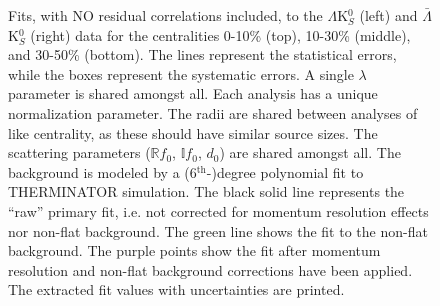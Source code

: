 \documentclass[/home/jesse/Analysis/FemtoAnalysis/AnalysisNotes/AnalysisNoteJBuxton.tex]{subfiles}
\renewcommand{\NonFlatBgdLamKs}{_NonFlatBgdCrctnLinear}
\renewcommand{\ResNum}{_NoRes}
\renewcommand{\SaveNameModLamKs}{\MomRes\NonFlatBgdLamKs\ResNum\ParamFixAndShareLamKs}
\begin{document}
\pagestyle{empty}
\begin{landscape}

\begin{figure}[h]
  \centering
  \caption[$\Lambda$K$^{0}_{S}$($\bar{\Lambda}$K$^{0}_{S}$) Fits with No Residuals]{Fits, with NO residual correlations included, to the $\Lambda$K$^{0}_{S}$ (left) and $\bar{\Lambda}$K$^{0}_{S}$ (right) data for the centralities 0-10\% (top), 10-30\% (middle), and 30-50\% (bottom).
 The lines represent the statistical errors, while the boxes represent the systematic errors.
 A single $\lambda$ parameter is shared amongst all.
 Each analysis has a unique normalization parameter.
 The radii are shared between analyses of like centrality, as these should have similar source sizes.
 The scattering parameters ($\mathbb{R}f_{0}$, $\mathbb{I}f_{0}$, $d_{0}$) are shared amongst all.
 The background is modeled by a (6$^{\mathrm{th}}$-)degree polynomial fit to THERMINATOR simulation.
 The black solid line represents the ``raw'' primary fit, i.e. not corrected for momentum resolution effects nor non-flat background.  
 The green line shows the fit to the non-flat background.
 The purple points show the fit after momentum resolution and non-flat background corrections have been applied.
 The extracted fit values with uncertainties are printed.}
  \label{fig:LamK0wConjFits_NoRes}
\end{figure}




\end{landscape}
\end{document}
